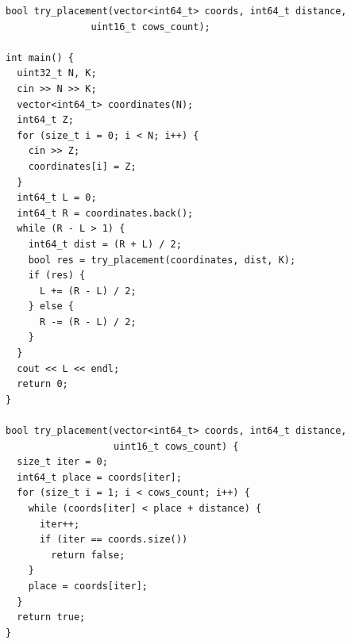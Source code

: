 \begin{center}
    \begin{verbatim}
bool try_placement(vector<int64_t> coords, int64_t distance,
               uint16_t cows_count);

int main() {
  uint32_t N, K;
  cin >> N >> K;
  vector<int64_t> coordinates(N);
  int64_t Z;
  for (size_t i = 0; i < N; i++) {
    cin >> Z;
    coordinates[i] = Z;
  }
  int64_t L = 0;
  int64_t R = coordinates.back();
  while (R - L > 1) {
    int64_t dist = (R + L) / 2;
    bool res = try_placement(coordinates, dist, K);
    if (res) {
      L += (R - L) / 2;
    } else {
      R -= (R - L) / 2;
    }
  }
  cout << L << endl;
  return 0;
}

bool try_placement(vector<int64_t> coords, int64_t distance,
                   uint16_t cows_count) {
  size_t iter = 0;
  int64_t place = coords[iter];
  for (size_t i = 1; i < cows_count; i++) {
    while (coords[iter] < place + distance) {
      iter++;
      if (iter == coords.size())
        return false;
    }
    place = coords[iter];
  }
  return true;
}

    \end{verbatim}
\end{center}
\normalsize
\BgThispage
\newpage


